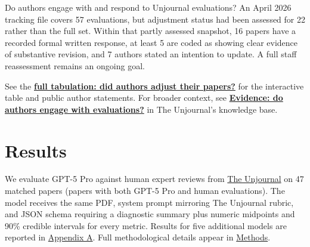 \documentclass[
  11pt,
  letterpaper,
]{article}
\begin{document}
\begin{tcolorbox}[enhanced jigsaw, colframe=quarto-callout-note-color-frame, breakable, rightrule=.15mm, toptitle=1mm, opacitybacktitle=0.6, opacityback=0, colback=white, bottomtitle=1mm, leftrule=.75mm, toprule=.15mm, coltitle=black, bottomrule=.15mm, titlerule=0mm, title=\textcolor{quarto-callout-note-color}{\faInfo}\hspace{0.5em}{Unjournal impact: author engagement evidence}, colbacktitle=quarto-callout-note-color!10!white, arc=.35mm, left=2mm]

Do authors engage with and respond to Unjournal evaluations? An April
2026 tracking file covers 57 evaluations, but adjustment status had been
assessed for 22 rather than the full set. Within that partly assessed
snapshot, 16 papers have a recorded formal written response, at least 5
are coded as showing clear evidence of substantive revision, and 7
authors stated an intention to update. A full staff reassessment remains
an ongoing goal.

See the \textbf{\href{paper_response_analysis.html}{full tabulation: did
authors adjust their papers?}} for the interactive table and public
author statements. For broader context, see
\textbf{\href{https://globalimpact.gitbook.io/the-unjournal-project-and-communication-space/benefits-and-features/more-reliable-and-useful-evaluation/author-engagement-evidence}{Evidence:
do authors engage with evaluations?}} in The Unjournal's knowledge base.

\end{tcolorbox}


\section{Results}\label{results}

We evaluate GPT-5 Pro against human expert reviews from
\href{https://unjournal.pubpub.org}{The Unjournal} on 47 matched papers
(papers with both GPT-5 Pro and human evaluations). The model receives
the same PDF, system prompt mirroring The Unjournal rubric, and JSON
schema requiring a diagnostic summary plus numeric midpoints and 90\%
credible intervals for every metric. Results for five additional models
are reported in \href{results_ratings.qmd}{Appendix A}. Full
methodological details appear in \href{methods.qmd}{Methods}.
\end{document}
